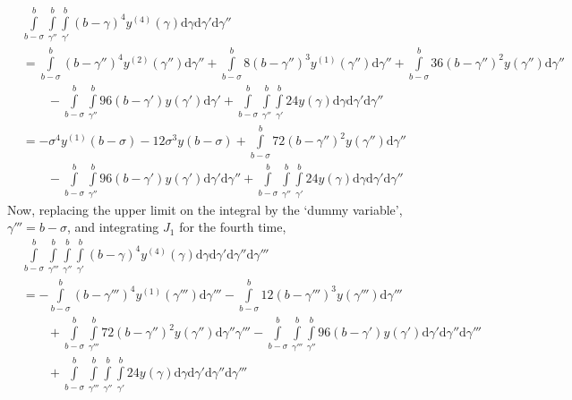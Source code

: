 \documentclass{article}
\begin{document}
\begin{equation}\label{eqn.59}
\begin{split}
	&\int\limits_{b-\sigma}^{b}\int\limits_{\gamma''}^{b}\int\limits_{\gamma'}^{b}(b-\gamma)^4y^{(4)}(\gamma)\mathrm{d}\gamma\mathrm{d}\gamma'\mathrm{d}\gamma''\\
	&=\int\limits_{b-\sigma}^{b}(b-\gamma'')^4y^{(2)}(\gamma'')\mathrm{d}\gamma'' + \int\limits_{b-\sigma}^{b}8(b-\gamma'')^3y^{(1)}(\gamma'')\mathrm{d}\gamma'' + \int\limits_{b-\sigma}^{b}36(b-\gamma'')^2y(\gamma'')\mathrm{d}\gamma''\\&\qquad{} - \int\limits_{b-\sigma}^{b}\int\limits_{\gamma''}^{b}96(b-\gamma')y(\gamma')\mathrm{d}\gamma' + \int\limits_{b-\sigma}^{b}\int\limits_{\gamma''}^{b}\int\limits_{\gamma'}^{b}24y(\gamma)\mathrm{d}\gamma\mathrm{d}\gamma'\mathrm{d}\gamma''\\
	&=-\sigma^{4}y^{(1)}(b-\sigma) - 12\sigma^{3}y(b-\sigma) + \int\limits_{b-\sigma}^{b}72(b-\gamma'')^{2}y(\gamma'')\mathrm{d}\gamma''\\&\qquad{}-\int\limits_{b-\sigma}^{b}\int\limits_{\gamma''}^{b}96(b-\gamma')y(\gamma')\mathrm{d}\gamma'\mathrm{d}\gamma''+\int\limits_{b-\sigma}^{b}\int\limits_{\gamma''}^{b}\int\limits_{\gamma'}^{b}24y(\gamma)\mathrm{d}\gamma\mathrm{d}\gamma'\mathrm{d}\gamma''
\end{split}
\end{equation}
Now, replacing the upper limit on the integral by the \lq dummy variable\rq, $\gamma''' = b-\sigma$, and integrating $J_1$ for the fourth time,
\begin{equation}\label{eqn.60}
\begin{split}
	&\int\limits_{b-\sigma}^{b}\int\limits_{\gamma'''}^{b}\int\limits_{\gamma''}^{b}\int\limits_{\gamma'}^{b}(b-\gamma)^{4}y^{(4)}(\gamma)\mathrm{d}\gamma\mathrm{d}\gamma'\mathrm{d}\gamma''\mathrm{d}\gamma'''\\
	&=-\int\limits_{b-\sigma}^{b}(b-\gamma''')^{4}y^{(1)}(\gamma''')\mathrm{d}\gamma''' - \int\limits_{b-\sigma}^{b}12(b-\gamma''')^{3}y(\gamma''')\mathrm{d}\gamma''' \\&\qquad{}+ \int\limits_{b-\sigma}^{b}\int\limits_{\gamma'''}^{b}72(b-\gamma'')^{2}y(\gamma'')\mathrm{d}\gamma''\gamma'''-\int\limits_{b-\sigma}^{b}\int\limits_{\gamma'''}^{b}\int\limits_{\gamma''}^{b}96(b-\gamma')y(\gamma')\mathrm{d}\gamma'\mathrm{d}\gamma''\mathrm{d}\gamma'''
	\\&\qquad{} + \int\limits_{b-\sigma}^{b}\int\limits_{\gamma'''}^{b}\int\limits_{\gamma''}^{b}\int\limits_{\gamma'}^{b}24y(\gamma)\mathrm{d}\gamma\mathrm{d}\gamma'\mathrm{d}\gamma''\mathrm{d}\gamma'''
\end{split}
\end{equation}
\end{document}
